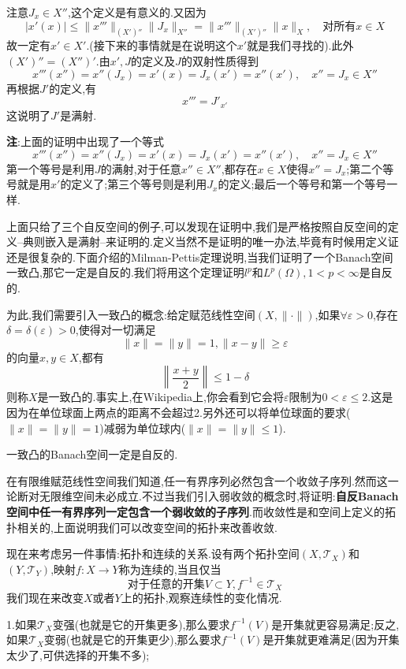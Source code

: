 注意$J_x\in X''$,这个定义是有意义的.又因为
$$
|x'(x)|\leqslant \|x'''\|_{(X')''}\|J_x\|_{X''}=\|x'''\|_{(X')''}\|x\|_{X},\quad \text{对所有}x\in X
$$
故一定有$x'\in X'$.(接下来的事情就是在说明这个$x'$就是我们寻找的).此外$(X')''=(X'')'$.由$x',J$的定义及$J$的双射性质得到
$$
x'''(x'')=x''(J_x)=x'(x)=J_x(x')=x''(x'),\quad x''=J_x\in X''
$$
再根据$J'$的定义,有
$$
x'''=J'_{x'}
$$
这说明了$J'$是满射.\par
\textbf{注}:上面的证明中出现了一个等式
$$
x'''(x'')=x''(J_x)=x'(x)=J_x(x')=x''(x'),\quad x''=J_x\in X''
$$
第一个等号是利用$J$的满射,对于任意$x''\in X''$,都存在$x\in X$使得$x''=J_x$;第二个等号就是用$x'$的定义了;第三个等号则是利用$J_x$的定义;最后一个等号和第一个等号一样.\par
上面只给了三个自反空间的例子,可以发现在证明中,我们是严格按照自反空间的定义--典则嵌入是满射--来证明的.定义当然不是证明的唯一办法,毕竟有时候用定义证还是很复杂的.下面介绍的Milman-Pettis定理说明,当我们证明了一个Banach空间一致凸,那它一定是自反的.我们将用这个定理证明$l^{p}$和$L^{p}(\Omega),1<p<\infty$是自反的.\par
为此,我们需要引入一致凸的概念:给定赋范线性空间$(X,\|\cdot\|)$,如果$\forall \varepsilon >0$,存在$\delta=\delta(\varepsilon)>0$,使得对一切满足
$$
\|x\|=\|y\|=1,\|x-y\|\geqslant \varepsilon
$$
的向量$x,y\in X$,都有
$$
\left\|\frac{x+y}{2}\right\|\leqslant 1-\delta
$$
则称$X$是一致凸的.事实上,在Wikipedia上,你会看到它会将$\varepsilon$限制为$0<\varepsilon\leqslant 2$.这是因为在单位球面上两点的距离不会超过2.另外还可以将单位球面的要求($\|x\|=\|y\|=1$)减弱为单位球内($\|x\|=\|y\|\leqslant 1$).\par
\begin{tcolorbox}[colback=KuangNei,colframe=BianKuang,title=\textbf{Milman-Pettis定理},sharpish corners]
一致凸的Banach空间一定是自反的.
\end{tcolorbox}
在有限维赋范线性空间我们知道,任一有界序列必然包含一个收敛子序列.然而这一论断对无限维空间未必成立.不过当我们引入弱收敛的概念时,将证明:\textbf{自反Banach空间中任一有界序列一定包含一个弱收敛的子序列}.而收敛性是和空间上定义的拓扑相关的,上面说明我们可以改变空间的拓扑来改善收敛.\par
现在来考虑另一件事情:拓扑和连续的关系.设有两个拓扑空间$(X,\mathcal{T}_X)$和$(Y,\mathcal{T}_Y)$,映射$f:X\to Y$称为连续的,当且仅当
$$
\text{对于任意的开集}V\subset Y,f^{-1}\in \mathcal{T}_X
$$
我们现在来改变$X$或者$Y$上的拓扑,观察连续性的变化情况.\par
1.如果$\mathcal{T}_X$变强(也就是它的开集更多),那么要求$f^{-1}(V)$是开集就更容易满足;反之,如果$\mathcal{T}_X$变弱(也就是它的开集更少),那么要求$f^{-1}(V)$是开集就更难满足(因为开集太少了,可供选择的开集不多);\par

